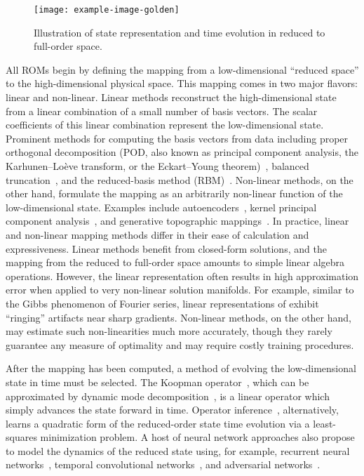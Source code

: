 \begin{figure}
	\centering
	\texttt{[image: example-image-golden]}
	\caption{\label{fig:mappingVis}Illustration of state representation and time evolution in reduced to full-order space.}
\end{figure}

All ROMs begin by defining the mapping from a low-dimensional ``reduced space'' to the high-dimensional physical space. This mapping comes in two major flavors: linear and non-linear. Linear methods reconstruct the high-dimensional state from a linear combination of a small number of basis vectors. The scalar coefficients of this linear combination represent the low-dimensional state. Prominent methods for computing the basis vectors from data including proper orthogonal decomposition (POD, also known as principal component analysis, the Karhunen--Loève transform, or the Eckart--Young theorem)~\cite{berkoozPOD}, balanced truncation~\cite{Gugercin2004}, and the reduced-basis method (RBM)~\cite{reducedBasisBook}. Non-linear methods, on the other hand, formulate the mapping as an arbitrarily non-linear function of the low-dimensional state. Examples include autoencoders~\cite{Kramer1991}, kernel principal component analysis~\cite{kernelPCA}, and generative topographic mappings~\cite{Bishop1997}. In practice, linear and non-linear mapping methods differ in their ease of calculation and expressiveness. Linear methods benefit from closed-form solutions, and the mapping from the reduced to full-order space amounts to simple linear algebra operations. However, the linear representation often results in high approximation error when applied to very non-linear solution manifolds. For example, similar to the Gibbs phenomenon of Fourier series, linear representations of exhibit ``ringing'' artifacts near sharp gradients. Non-linear methods, on the other hand, may estimate such non-linearities much more accurately, though they rarely guarantee any measure of optimality and may require costly training procedures.

After the mapping has been computed, a method of evolving the low-dimensional state in time must be selected. The Koopman operator~\cite{Budisic2012}, which can be approximated by dynamic mode decomposition~\cite{Schmid2010}, is a linear operator which simply advances the state forward in time. Operator inference~\cite{Peherstorfer2016}, alternatively, learns a quadratic form of the reduced-order state time evolution via a least-squares minimization problem. A host of neural network approaches also propose to model the dynamics of the reduced state using, for example, recurrent neural networks~\cite{Gonzalez2018}, temporal convolutional networks~\cite{Xu2020}, and adversarial networks~\cite{QuilodranCasas2021}.

